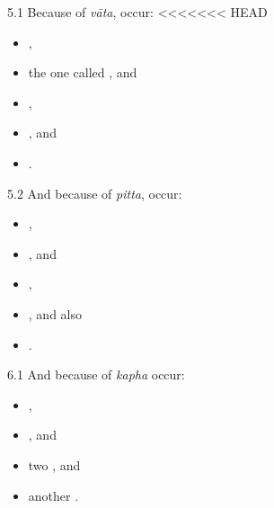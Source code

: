 \begin{translation}
\item [5.1] Because of \emph{vāta}, occur:
<<<<<<< HEAD
	\begin{itemize}
		\item {},
		\item the one called , and
		\item {},
		\item {}, and
		\item {}.
	\end{itemize}

\item [5.2] And because of \emph{pitta}, occur:
	\begin{itemize}
		\item {},
		\item {}, and
		\item {},
		\item {}, and also
		\item {}.
	\end{itemize}


\item [6.1] And because of \emph{kapha} occur:
	\begin{itemize}
		\item {},
		\item {}, and
		\item two , and
		\item another .
	\end{itemize}


\end{translation}
